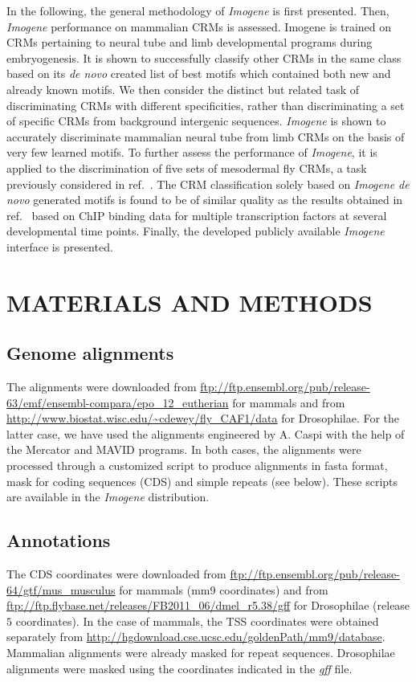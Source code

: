 \documentclass[a4,center,fleqn]{NAR}
\begin{document}
In the following, the general methodology of {\em Imogene} is first presented.
Then, {\em Imogene} performance on mammalian CRMs is assessed.
Imogene is trained on CRMs pertaining to  neural tube and limb developmental
programs during embryogenesis.
It is shown to successfully classify other CRMs in the same class based on its
{\em de novo} created list of best motifs which contained both new and already
known motifs. 
We then consider the distinct but related task of discriminating CRMs with
different specificities, rather than discriminating a set of specific CRMs from
background intergenic sequences.
{\em Imogene} is shown to accurately discriminate  mammalian neural tube from
limb CRMs on the basis of very few learned motifs.
To further assess the performance of {\em Imogene}, it is applied to the
discrimination of five sets of  mesodermal fly CRMs, a task previously
considered in ref.~\cite{pmid19890324}.
The CRM classification solely based on {\em Imogene} {\em de novo} generated
motifs is found to be of similar quality as the results obtained in
ref.~\cite{pmid19890324} based on ChIP binding data for multiple transcription
factors at several developmental time points.
Finally, the developed publicly available {\em Imogene}  interface is
presented.



\section{MATERIALS AND METHODS}

\subsection*{Genome alignments}
The alignments were downloaded from
\url{ftp://ftp.ensembl.org/pub/release-63/emf/ensembl-compara/epo_12_eutherian}
for mammals and from \url{http://www.biostat.wisc.edu/~cdewey/fly_CAF1/data}
for Drosophilae.
For the latter case, we have used the alignments engineered by A. Caspi with
the help of the Mercator and MAVID programs.
In both cases, the alignments were processed through a customized script to
produce alignments in fasta format, mask for coding sequences (CDS) and simple
repeats (see below).
These scripts are available in the {\em Imogene} distribution.

\subsection*{Annotations}
The CDS coordinates were downloaded from
\url{ftp://ftp.ensembl.org/pub/release-64/gtf/mus_musculus} for mammals (mm9
coordinates) and from
\url{ftp://ftp.flybase.net/releases/FB2011_06/dmel_r5.38/gff} for Drosophilae
(release $5$ coordinates).
In the case of mammals, the TSS coordinates were obtained separately from
\url{http://hgdownload.cse.ucsc.edu/goldenPath/mm9/database}.
Mammalian alignments  were already masked for repeat sequences.
Drosophilae alignments were masked using the coordinates indicated in the
\textit{gff} file.
\end{document}
